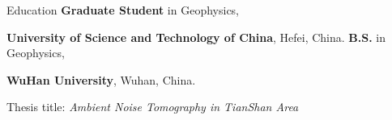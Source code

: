 \begin{rubric}{Education}
\entry*[2017 -- present]
    \textbf{Graduate Student} in Geophysics,
    \par\textbf{University of Science and Technology of China}, Hefei, China.
\entry*[2013 -- 2017]%
    \textbf{B.S.} in Geophysics,
    \par\textbf{WuHan University}, Wuhan, China.
	\par Thesis title: \emph{Ambient Noise Tomography in TianShan Area}
\end{rubric}
